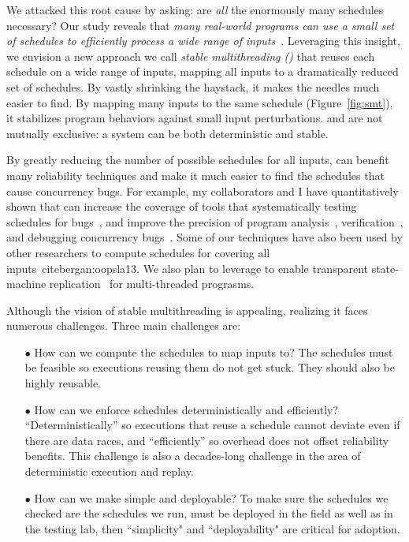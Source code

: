 We attacked this root cause by asking: are \emph{all} the enormously
many schedules necessary?  Our study reveals that \emph{many real-world
  programs can use a small set of schedules to efficiently process a wide
  range of inputs}~\cite{cui:tern:osdi10}.  Leveraging this insight, we
envision a new approach we call \emph{stable multithreading (\smt)}
that reuses each schedule on a wide range of inputs, mapping all inputs to a dramatically
reduced set of schedules. By vastly shrinking the haystack, it makes the
needles much easier to find.  By mapping many inputs to the same schedule (Figure~\ref{fig:smt}),
it stabilizes program behaviors against small input perturbations. 
\smt and \dmt are not mutually exclusive: a system can be both
deterministic and stable.

By greatly reducing the number of possible schedules for all inputs, \smt can benefit many reliability 
techniques and make it much easier to find the schedules that cause concurrency 
bugs. For example, my collaborators and I have quantitatively shown that \smt can 
increase the coverage of tools that systematically testing schedules for 
bugs~\cite{parrot:sosp13, dbug:spin11, modist:nsdi09}, and improve the precision 
of program analysis~\cite{wu:pldi12}, verification~\cite{wu:pldi12}, and 
debugging concurrency bugs~\cite{cui:tern:osdi10}. Some of our \smt techniques have 
also been used by other researchers to compute schedules for covering all 
inputs~cite{bergan:oopsla13}. We also plan to leverage \smt to enable transparent 
state-machine replication~\cite{paxos} for multi-threaded prograsms.

Although the vision of stable multithreading is appealing, realizing it
faces numerous challenges.  Three main challenges are:

\begin{enumerate}

\item[$\bullet$] How can we compute the schedules to map inputs to?  The 
schedules
  must be feasible so executions reusing them do not get stuck.
  They should also be highly reusable.

\item[$\bullet$] How can we enforce schedules deterministically and
  efficiently?  ``Deterministically'' so executions that reuse a schedule
  cannot deviate even if there are data races, and ``efficiently'' so
  overhead does not offset reliability benefits.
  This challenge is also a decades-long challenge in the area of
  deterministic execution and replay.

\item[$\bullet$] How can we make \smt simple and deployable? To make sure 
  the schedules we checked are the schedules we run, \smt must be 
 deployed in the field as well as in the testing lab, then ``simplicity" and 
 ``deployability" are  critical for adoption.

\end{enumerate}

